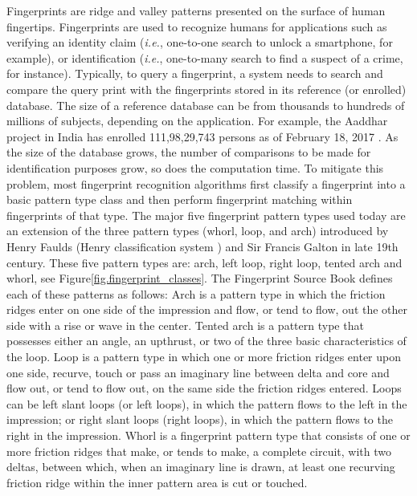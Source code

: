 

Fingerprints are ridge and valley patterns presented on the surface of human fingertips.
%
Fingerprints are used to recognize humans for applications such as verifying an identity claim (\textit{i.e.}, one-to-one search to  unlock a smartphone, for example), or identification (\textit{i.e.}, one-to-many search to find a suspect of a crime, for instance).
%
Typically, to query a fingerprint, a system needs to search and compare the query print with the fingerprints stored in its reference (or enrolled) database.  The size of a reference database can be from thousands to hundreds of millions of subjects, depending on the application. For example, the Aaddhar project in India has enrolled 111,98,29,743 persons as of February 18, 2017 \cite{aaddhaar}.  
%
As the size of the database grows, the number of comparisons to be made for identification purposes grow, so does the computation time.
%
To mitigate this problem, most fingerprint recognition algorithms first classify a fingerprint into a basic pattern type class and then perform fingerprint matching within fingerprints of that type.
%
The major five fingerprint pattern types used today are an extension of the three pattern types (whorl, loop, and arch) introduced by Henry Faulds (Henry classification system \cite{henry1905classification}) and Sir Francis Galton \cite{galton1892} in late 19th century. These five pattern types are: arch, left loop, right loop, tented arch and whorl, see Figure\ref{fig.fingerprint_classes}.  
%
The Fingerprint Source Book \cite{nijSourceBook} defines each of these patterns as follows: 
%
Arch is a pattern type in which the friction ridges enter on one side of the impression and flow, or tend to flow, out the other side with a rise or wave in the center. 
%
Tented arch is a pattern type that possesses either an angle, an upthrust, or two of the three basic characteristics of the loop. 
%
Loop is a pattern type in which one or more friction ridges enter upon one side, recurve, touch or pass an imaginary line between delta and core and flow out, or tend to flow out, on the same side the friction ridges entered. Loops can be left slant loops (or left loops), in which the pattern flows to the left in the impression; or right slant loops (right loops), in which the pattern flows to the right in the impression.
%
Whorl is a fingerprint pattern type that consists of one or more friction ridges that make, or tends to make, a complete circuit, with two deltas, between which, when an imaginary line is drawn, at least one recurving friction ridge within the inner pattern area is cut or touched. 

